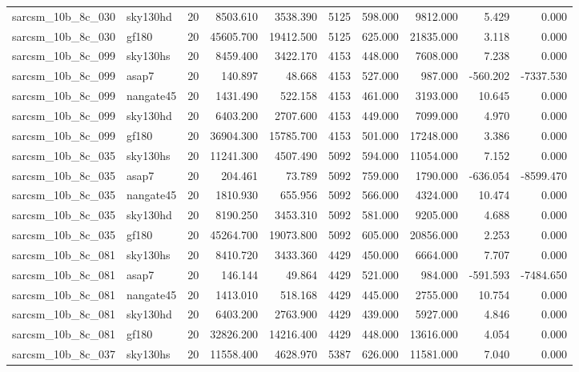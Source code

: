 \documentclass{article}
\begin{document}
\begin{longtable}{llrrrrrrrr}
sarcsm\_10b\_8c\_030 & sky130hd & 20 & 8503.610 & 3538.390 & 5125 & 598.000 & 9812.000 & 5.429 & 0.000 \\
sarcsm\_10b\_8c\_030 & gf180 & 20 & 45605.700 & 19412.500 & 5125 & 625.000 & 21835.000 & 3.118 & 0.000 \\
sarcsm\_10b\_8c\_099 & sky130hs & 20 & 8459.400 & 3422.170 & 4153 & 448.000 & 7608.000 & 7.238 & 0.000 \\
sarcsm\_10b\_8c\_099 & asap7 & 20 & 140.897 & 48.668 & 4153 & 527.000 & 987.000 & -560.202 & -7337.530 \\
sarcsm\_10b\_8c\_099 & nangate45 & 20 & 1431.490 & 522.158 & 4153 & 461.000 & 3193.000 & 10.645 & 0.000 \\
sarcsm\_10b\_8c\_099 & sky130hd & 20 & 6403.200 & 2707.600 & 4153 & 449.000 & 7099.000 & 4.970 & 0.000 \\
sarcsm\_10b\_8c\_099 & gf180 & 20 & 36904.300 & 15785.700 & 4153 & 501.000 & 17248.000 & 3.386 & 0.000 \\
sarcsm\_10b\_8c\_035 & sky130hs & 20 & 11241.300 & 4507.490 & 5092 & 594.000 & 11054.000 & 7.152 & 0.000 \\
sarcsm\_10b\_8c\_035 & asap7 & 20 & 204.461 & 73.789 & 5092 & 759.000 & 1790.000 & -636.054 & -8599.470 \\
sarcsm\_10b\_8c\_035 & nangate45 & 20 & 1810.930 & 655.956 & 5092 & 566.000 & 4324.000 & 10.474 & 0.000 \\
sarcsm\_10b\_8c\_035 & sky130hd & 20 & 8190.250 & 3453.310 & 5092 & 581.000 & 9205.000 & 4.688 & 0.000 \\
sarcsm\_10b\_8c\_035 & gf180 & 20 & 45264.700 & 19073.800 & 5092 & 605.000 & 20856.000 & 2.253 & 0.000 \\
sarcsm\_10b\_8c\_081 & sky130hs & 20 & 8410.720 & 3433.360 & 4429 & 450.000 & 6664.000 & 7.707 & 0.000 \\
sarcsm\_10b\_8c\_081 & asap7 & 20 & 146.144 & 49.864 & 4429 & 521.000 & 984.000 & -591.593 & -7484.650 \\
sarcsm\_10b\_8c\_081 & nangate45 & 20 & 1413.010 & 518.168 & 4429 & 445.000 & 2755.000 & 10.754 & 0.000 \\
sarcsm\_10b\_8c\_081 & sky130hd & 20 & 6403.200 & 2763.900 & 4429 & 439.000 & 5927.000 & 4.846 & 0.000 \\
sarcsm\_10b\_8c\_081 & gf180 & 20 & 32826.200 & 14216.400 & 4429 & 448.000 & 13616.000 & 4.054 & 0.000 \\
sarcsm\_10b\_8c\_037 & sky130hs & 20 & 11558.400 & 4628.970 & 5387 & 626.000 & 11581.000 & 7.040 & 0.000 \\

\end{longtable}
\end{document}

